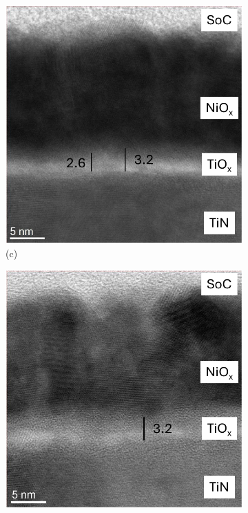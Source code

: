 \begin{figure}[htbp]
    \vspace{0.5cm}
    \begin{subfigure}[t]{0.35\textwidth}
        \centering
        \includegraphics[width=\textwidth]{chapters/transport_layers/images/TiN-NiO Interface_As_Dep.pdf} %
        \caption*{(c)}
    \end{subfigure}
    \hspace{1.2cm}
    \begin{subfigure}[t]{0.35\textwidth}
        \centering
        \includegraphics[width=\textwidth]{chapters/transport_layers/images/TiN-NiO Interface_5min.pdf} %

\end{subfigure}
\end{figure}
